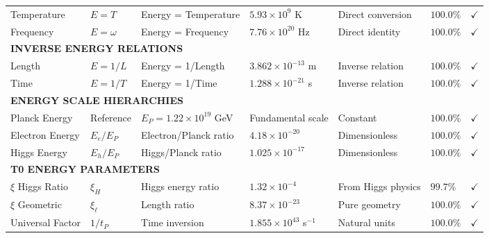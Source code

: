 \documentclass[12pt,a4paper]{article}
\newcommand{\checked}{\checkmark}
\begin{document}
\begin{landscape}
\begin{longtable}{p{3.5cm}p{2.5cm}p{2.5cm}p{4cm}p{3cm}p{2cm}p{1cm}}
		Temperature & $E = T$ & Energy = Temperature & $5.93 \times 10^9$ K & Direct conversion & $\mathbf{100.0\%}$ & $\checked$ \\
		
		Frequency & $E = \omega$ & Energy = Frequency & $7.76 \times 10^{20}$ Hz & Direct identity & $\mathbf{100.0\%}$ & $\checked$ \\
		
		\multicolumn{7}{l}{\textbf{INVERSE ENERGY RELATIONS}} \\
		\midrule
		
		Length & $E = 1/L$ & Energy = 1/Length & $3.862 \times 10^{-13}$ m & Inverse relation & $\mathbf{100.0\%}$ & $\checked$ \\
		
		Time & $E = 1/T$ & Energy = 1/Time & $1.288 \times 10^{-21}$ s & Inverse relation & $\mathbf{100.0\%}$ & $\checked$ \\
		
		\multicolumn{7}{l}{\textbf{ENERGY SCALE HIERARCHIES}} \\
		\midrule
		
		Planck Energy & Reference & $E_P = 1.22 \times 10^{19}$ GeV & Fundamental scale & Constant & $\mathbf{100.0\%}$ & $\checked$ \\
		
		Electron Energy & $E_e/E_P$ & Electron/Planck ratio & $4.18 \times 10^{-20}$ & Dimensionless & $\mathbf{100.0\%}$ & $\checked$ \\
		
		Higgs Energy & $E_h/E_P$ & Higgs/Planck ratio & $1.025 \times 10^{-17}$ & Dimensionless & $\mathbf{100.0\%}$ & $\checked$ \\
		
		\multicolumn{7}{l}{\textbf{T0 ENERGY PARAMETERS}} \\
		\midrule
		
		$\xi$ Higgs Ratio & $\xi_H$ & Higgs energy ratio & $1.32 \times 10^{-4}$ & From Higgs physics & $\mathbf{99.7\%}$ & $\checked$ \\
		
		$\xi$ Geometric & $\xi_\ell$ & Length ratio & $8.37 \times 10^{-23}$ & Pure geometry & $\mathbf{100.0\%}$ & $\checked$ \\
		
		Universal Factor & $1/t_P$ & Time inversion & $1.855 \times 10^{43}$ s$^{-1}$ & Natural units & $\mathbf{100.0\%}$ & $\checked$ \\
		

\end{longtable}
\end{landscape}
\end{document}
